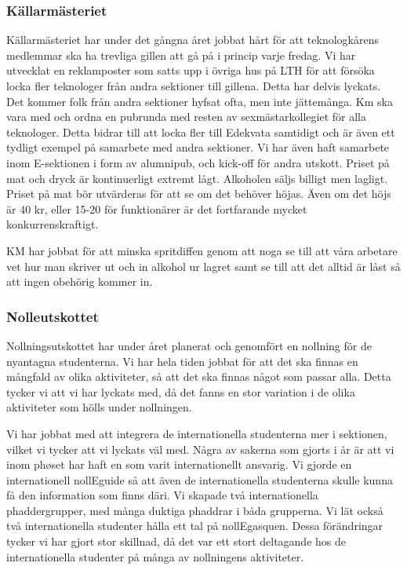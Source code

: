 \documentclass[../_main/handlingar.tex]{subfiles}
\begin{document}
\subsubsection*{Källarmästeriet}
Källarmästeriet har under det gångna året jobbat hårt för att teknologkårens medlemmar ska ha trevliga gillen att gå på i princip varje fredag. Vi har utvecklat en reklamposter som satts upp i övriga hus på LTH för att försöka locka fler teknologer från andra sektioner till gillena. Detta har delvis lyckats. Det kommer folk från andra sektioner hyfsat ofta, men inte jättemånga. 
Km ska vara med och ordna en pubrunda med resten av sexmästarkollegiet för alla teknologer. Detta bidrar till att locka fler till Edekvata samtidigt och är även ett tydligt exempel på samarbete med andra sektioner. Vi har även haft samarbete inom E-sektionen i form av alumnipub, och kick-off för andra utskott.
Priset på mat och dryck är kontinuerligt extremt lågt. Alkoholen säljs billigt men lagligt. Priset på mat bör utvärderas för att se om det behöver höjas. Även om det höjs är 40 kr, eller 15-20 för funktionärer är det fortfarande mycket konkurrenskraftigt.

KM har jobbat för att minska spritdiffen genom att noga se till att våra arbetare vet hur man skriver ut och in alkohol ur lagret samt se till att det alltid är låst så att ingen obehörig kommer in.

\subsubsection*{Nolleutskottet}
Nollningsutskottet har under året planerat och genomfört en nollning för de nyantagna studenterna. Vi har hela tiden jobbat för att det ska finnas en mångfald av olika aktiviteter, så att det ska finnas något som passar alla. Detta tycker vi att vi har lyckats med, då det fanns en stor variation i de olika aktiviteter som hölls under nollningen. 

Vi har jobbat med att integrera de internationella studenterna mer i sektionen, vilket vi tycker att vi lyckats väl med. Några av sakerna som gjorts i år är att vi inom phøset har haft en som varit internationellt ansvarig. Vi gjorde en internationell nollEguide så att även de internationella studenterna skulle kunna få den information som finns däri. Vi skapade två internationella phaddergrupper, med många duktiga phaddrar i båda grupperna. Vi lät också två internationella studenter hålla ett tal på nollEgasquen. Dessa förändringar tycker vi har gjort stor skillnad, då det var ett stort deltagande hos de internationella studenter på många av nollningens aktiviteter.
\end{document}
